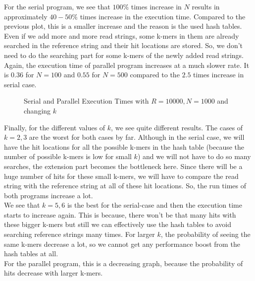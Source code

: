\documentclass{article}
\begin{document}
For the serial program, we see that $100\%$ times increase in $N$ results in approximately $40-50\%$ times increase in the execution time. Compared to the previous plot, this is a smaller increase and the reason is the used hash tables. Even if we add more and more read strings, some k-mers in them are already searched in the reference string and their hit locations are stored. So, we don't need to do the searching part for some k-mers of the newly added read strings. Again, the execution time of parallel program increases at a much slower rate. It is $0.36$ for $N=100$ and $0.55$ for $N=500$ compared to the $2.5$ times increase in serial case.

\begin{center}
\begin{figure}[H]
\caption{Serial and Parallel Execution Times with $R=10000, N=1000$ and changing $k$}
\end{figure}
\end{center}

Finally, for the different values of $k$, we see quite different results. The cases of $k=2,3$ are the worst for both cases by far. Although in the serial case, we will have the hit locations for all the possible k-mers in the hash table (because the number of possible k-mers is low for small $k$) and we will not have to do so many searches, the extension part becomes the bottleneck here. Since there will be a huge number of hits for these small k-mers, we will have to compare the read string with the reference string at all of these hit locations. So, the run times of both programs increase a lot. \\

We see that $k=5,6$ is the best for the serial-case and then the execution time starts to increase again. This is because, there won't be that many hits with these bigger k-mers but still we can effectively use the hash tables to avoid searching reference strings many times. For larger $k$, the probability of seeing the same k-mers decrease a lot, so we cannot get any performance boost from the hash tables at all. \\

For the parallel program, this is a decreasing graph, because the probability of hits decrease with larger k-mers. 
\end{document}
